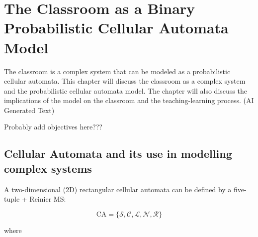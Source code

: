 \chapter{The Classroom as a Binary Probabilistic Cellular Automata Model}
\hspace{\parindent} The classroom is a complex system that can be modeled as a probabilistic cellular automata. This chapter will discuss the classroom as a complex system and the probabilistic cellular automata model. The chapter will also discuss the implications of the model on the classroom and the teaching-learning process. (AI Generated Text)

Probably add objectives here???

\section{Cellular Automata and its use in modelling complex systems}

A two-dimensional (2D) rectangular cellular automata can be defined by a five-tuple \cite{arciaga2009experimental} + Reinier MS:

\begin{equation}
    \label{eq:CA definition}
    \text{CA} = \lbrace \mathcal{S,C,L,N,R} \rbrace
\end{equation}

where
\newcommand\itemS{\item[$\mathcal{S}=$]}
\newcommand\itemC{\item[$\mathcal{C}=$]}
\newcommand\itemL{\item[$\mathcal{L}=$]}
\newcommand\itemN{\item[$\mathcal{N}=$]}
\newcommand\itemR{\item[$\mathcal{R}=$]}

